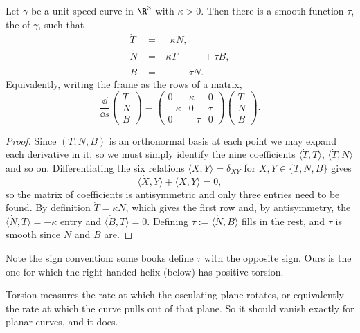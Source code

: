 \begin{theorem}
    Let $\gamma$ be a unit speed curve in $\R^3$ with $\kappa > 0$. Then there is a smooth function $\tau$, the  of $\gamma$, such that
    \begin{align*}
        \dot T &= \phantom{-}\kappa N, \\
        \dot N &= -\kappa T \phantom{{}+ \kappa N} + \tau B, \\
        \dot B &= \phantom{-\kappa T{}} - \tau N.
    \end{align*}
    Equivalently, writing the frame as the rows of a matrix,
    $$
    \frac{\dd}{\dd s}\begin{pmatrix} T \\ N \\ B\end{pmatrix} = \begin{pmatrix} 0 & \kappa & 0 \\ -\kappa & 0 & \tau \\ 0 & -\tau & 0\end{pmatrix}\begin{pmatrix} T \\ N \\ B \end{pmatrix}.
    $$
\end{theorem}
\begin{proof}
    Since $(T, N, B)$ is an orthonormal basis at each point we may expand each derivative in it, so we must simply identify the nine coefficients $\langle \dot T, T\rangle$, $\langle \dot T, N\rangle$ and so on. Differentiating the six relations $\langle X, Y \rangle = \delta_{XY}$ for $X, Y \in \{T, N, B\}$ gives
    $$
    \langle \dot X, Y \rangle + \langle X, \dot Y \rangle = 0,
    $$
    so the matrix of coefficients is antisymmetric and only three entries need to be found. By definition $\dot T = \kappa N$, which gives the first row and, by antisymmetry, the $\langle \dot N, T\rangle = -\kappa$ entry and $\langle \dot B, T \rangle = 0$. Defining $\tau := \langle \dot N, B \rangle$ fills in the rest, and $\tau$ is smooth since $N$ and $B$ are.
\end{proof}

\begin{remark}
    Note the sign convention: some books define $\tau$ with the opposite sign. Ours is the one for which the right-handed helix (below) has positive torsion.
\end{remark}

Torsion measures the rate at which the osculating plane rotates, or equivalently the rate at which the curve pulls out of that plane. So it should vanish exactly for planar curves, and it does.

